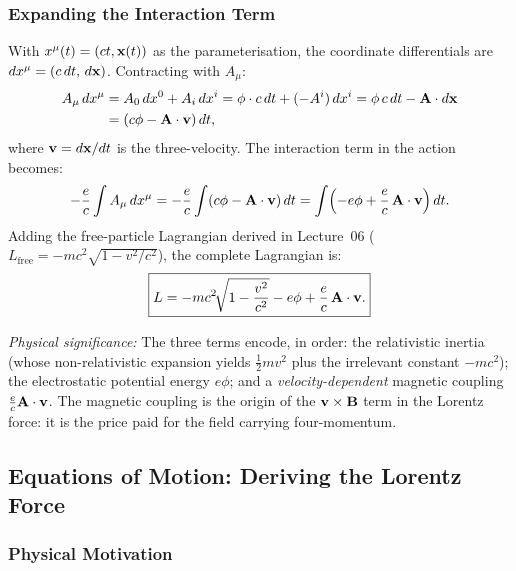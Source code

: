 \subsubsection*{Expanding the Interaction Term}

With $x^\mu(t) = (ct, \mathbf{x}(t))$ as the parameterisation, the coordinate
differentials are $dx^\mu = (c\,dt,\,d\mathbf{x})$.  Contracting with $A_\mu$:
\begin{align}
    A_\mu\,dx^\mu
    &= A_0\,dx^0 + A_i\,dx^i
     = \phi\cdot c\,dt + (-A^i)\,dx^i
     = \phi\,c\,dt - \mathbf{A}\cdot d\mathbf{x} \notag \\
    &= \left(c\phi - \mathbf{A}\cdot\mathbf{v}\right)dt ,
    \label{eq:lec07:Amu-dxmu}
\end{align}
where $\mathbf{v} = d\mathbf{x}/dt$ is the three-velocity.  The interaction term in
the action becomes:
\begin{equation}\label{eq:lec07:Sint}
    -\frac{e}{c}\int A_\mu\,dx^\mu
    = -\frac{e}{c}\int\!\left(c\phi - \mathbf{A}\cdot\mathbf{v}\right)dt
    = \int\!\left(-e\phi + \frac{e}{c}\,\mathbf{A}\cdot\mathbf{v}\right)dt .
\end{equation}
Adding the free-particle Lagrangian derived in Lecture~06
($L_{\text{free}} = -mc^2\!\sqrt{1-v^2/c^2}$), the complete Lagrangian is:
\begin{equation}\label{eq:lec07:lagrangian}
    \boxed{L = -mc^2\!\sqrt{1-\frac{v^2}{c^2}} - e\phi + \frac{e}{c}\,\mathbf{A}\cdot\mathbf{v} .}
\end{equation}

\textit{Physical significance:} The three terms encode, in order: the
relativistic inertia (whose non-relativistic expansion yields $\tfrac{1}{2}mv^2$
plus the irrelevant constant $-mc^2$); the electrostatic potential energy $e\phi$;
and a \emph{velocity-dependent} magnetic coupling $\tfrac{e}{c}\mathbf{A}\cdot\mathbf{v}$.
The magnetic coupling is the origin of the $\mathbf{v}\times\mathbf{B}$ term in the
Lorentz force: it is the price paid for the field carrying four-momentum.

\subsection{Equations of Motion: Deriving the Lorentz Force}\label{sec:lec07:EOM}

\subsubsection*{Physical Motivation}

